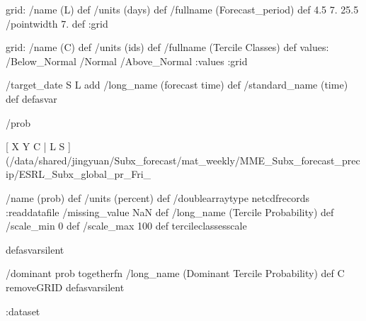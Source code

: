 \begin{ingrid}
grid:
/name (L) def
/units (days) def
/fullname (Forecast_period) def
4.5 7. 25.5
/pointwidth 7. def
:grid

grid:
/name (C) def
/units (ids) def
/fullname (Tercile Classes) def
values: /Below_Normal /Normal /Above_Normal :values
:grid

/target_date { S L add /long_name (forecast time) def /standard_name (time) def } defasvar

/prob {
[ X Y C | L S ] (/data/shared/jingyuan/Subx_forecast/mat_weekly/MME_Subx_forecast_precip/ESRL_Subx_global_pr_Fri_%

/name (prob) def
/units (percent) def
/doublearraytype netcdfrecords :readdatafile
/missing_value NaN def
/long_name (Tercile Probability) def
/scale_min 0 def
/scale_max 100 def
tercileclassesscale
} defasvarsilent

/dominant {
prob togetherfn
/long_name (Dominant Tercile Probability) def
C removeGRID
} defasvarsilent

:dataset
\end{ingrid}
